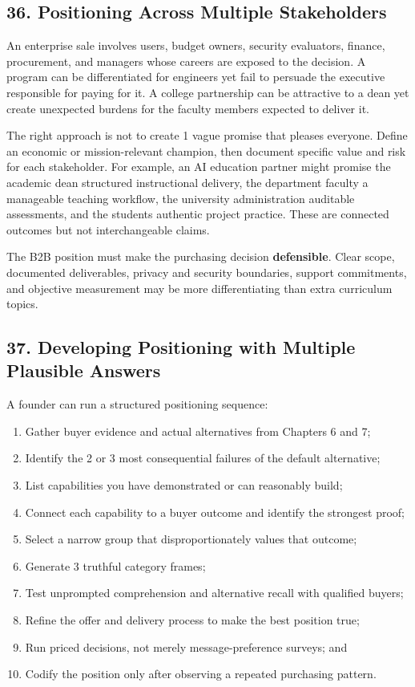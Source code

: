 \subsection*{36. Positioning Across Multiple Stakeholders}

An enterprise sale involves users, budget owners, security evaluators, finance, procurement, and managers whose careers are exposed to the decision. A program can be differentiated for engineers yet fail to persuade the executive responsible for paying for it. A college partnership can be attractive to a dean yet create unexpected burdens for the faculty members expected to deliver it.

The right approach is not to create 1 vague promise that pleases everyone. Define an economic or mission-relevant champion, then document specific value and risk for each stakeholder. For example, an AI education partner might promise the academic dean structured instructional delivery, the department faculty a manageable teaching workflow, the university administration auditable assessments, and the students authentic project practice. These are connected outcomes but not interchangeable claims.

The B2B position must make the purchasing decision \textbf{defensible}. Clear scope, documented deliverables, privacy and security boundaries, support commitments, and objective measurement may be more differentiating than extra curriculum topics.

\subsection*{37. Developing Positioning with Multiple Plausible Answers}

A founder can run a structured positioning sequence:

\begin{enumerate}
    \item Gather buyer evidence and actual alternatives from Chapters 6 and 7;
    \item Identify the 2 or 3 most consequential failures of the default alternative;
    \item List capabilities you have demonstrated or can reasonably build;
    \item Connect each capability to a buyer outcome and identify the strongest proof;
    \item Select a narrow group that disproportionately values that outcome;
    \item Generate 3 truthful category frames;
    \item Test unprompted comprehension and alternative recall with qualified buyers;
    \item Refine the offer and delivery process to make the best position true;
    \item Run priced decisions, not merely message-preference surveys; and
    \item Codify the position only after observing a repeated purchasing pattern.
\end{enumerate}

